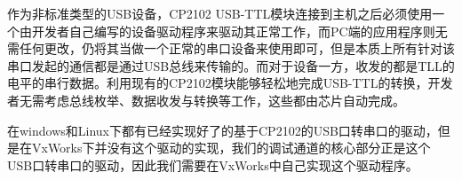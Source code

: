 	
	作为非标准类型的USB设备，CP2102 USB-TTL模块连接到主机之后必须使用一个由开发者自己编写的设备驱动程序来驱动其正常工作，而PC端的应用程序则无需任何更改，仍将其当做一个正常的串口设备来使用即可，但是本质上所有针对该串口发起的通信都是通过USB总线来传输的。而对于设备一方，收发的都是TLL的电平的串行数据。利用现有的CP2102模块能够轻松地完成USB-TTL的转换，开发者无需考虑总线枚举、数据收发与转换等工作，这些都由芯片自动完成。
	
	在windows和Linux下都有已经实现好了的基于CP2102的USB口转串口的驱动，但是在VxWorks下并没有这个驱动的实现，我们的调试通道的核心部分正是这个USB口转串口的驱动，因此我们需要在VxWorks中自己实现这个驱动程序。
		




